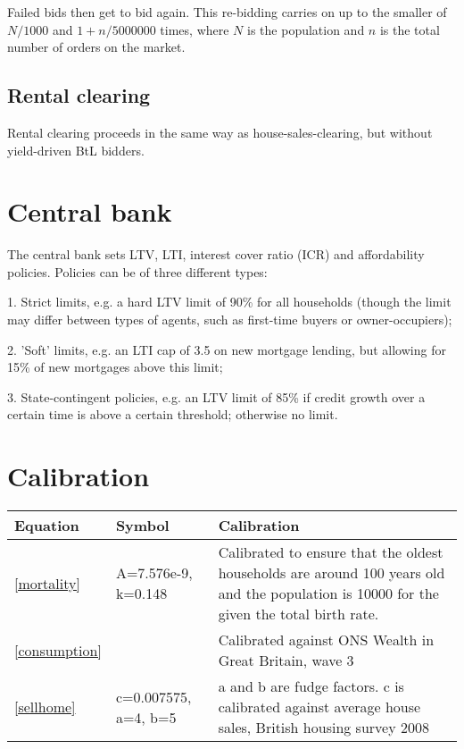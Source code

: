 \documentclass{article}
\begin{document}
Failed bids then get to bid again. This re-bidding carries on up to the smaller of $N/1000$ and $1+n/5000000$ times, where $N$ is the population and $n$ is the total number of orders on the market.

\subsection{Rental clearing}

Rental clearing proceeds in the same way as house-sales-clearing, but
without yield-driven BtL bidders.\bigskip

\section{Central bank}

The central bank sets LTV, LTI, interest cover ratio (ICR) and affordability
policies. Policies can be of three different types:

1. Strict limits, e.g. a hard LTV limit of 90\% for all households (though
the limit may differ between types of agents, such as first-time buyers or
owner-occupiers);

2. 'Soft' limits, e.g. an LTI cap of 3.5 on new mortgage lending, but
allowing for 15\% of new mortgages above this limit;

3. State-contingent policies, e.g. an LTV limit of 85\% if credit growth
over a certain time is above a certain threshold; otherwise no limit.

\section{Calibration}


\begin{tabular}{|l|p{30mm}|p{75mm}|}
\hline
Equation & Symbol & Calibration \\ \hline
\ref{mortality} & A=7.576e-9, k=0.148 & Calibrated to ensure that the oldest households are around 100 years old and the population is 10000 for the given the total birth rate.\\ \hline
\ref{consumption} & & Calibrated against ONS Wealth in Great Britain, wave 3 \\ \hline
\ref{sellhome} & c=0.007575, a=4, b=5 & a and b are fudge factors. c is calibrated against average house sales, British housing survey 2008 \\ \hline
\end{tabular}
\end{document}
